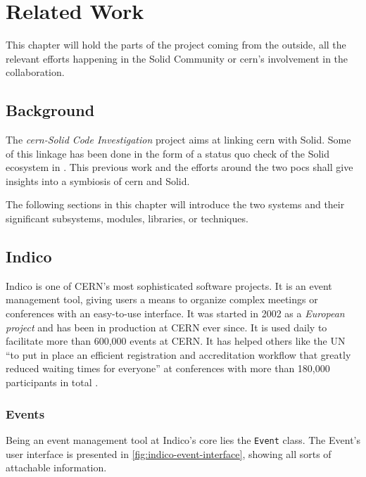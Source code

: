 \chapter{Related Work}

This chapter will hold the parts of the project coming from the outside, all the relevant efforts happening in the Solid Community or \gls{cern}'s involvement in the collaboration.

\section{Background}

The \textit{\gls{cern}-Solid Code Investigation} project aims at linking \gls{cern} with Solid. Some of this linkage has been done in the form of a status quo check of the Solid ecosystem in \cite{cern-solid-investigation-spec}. This previous work and the efforts around the two \glspl{poc} shall give insights into a symbiosis of \gls{cern} and Solid.

The following sections in this chapter will introduce the two systems and their significant subsystems, modules, libraries, or techniques. 

\section{Indico}

Indico is one of CERN’s most sophisticated software projects. It is an event management tool, giving users a means to organize complex meetings or conferences with an easy-to-use interface. It was started in 2002 as a \textit{European project} and has been in production at CERN ever since. It is used daily to facilitate more than 600,000 events at CERN. It has helped others like the UN “to put in place an efficient registration and accreditation workflow that greatly reduced waiting times for everyone” at conferences with more than 180,000 participants in total \cite{cern-solid-investigation-spec}.

\subsection{Events}

Being an event management tool at Indico's core lies the \texttt{Event} class. The Event's user interface is presented in \ref{fig:indico-event-interface}, showing all sorts of attachable information. 

